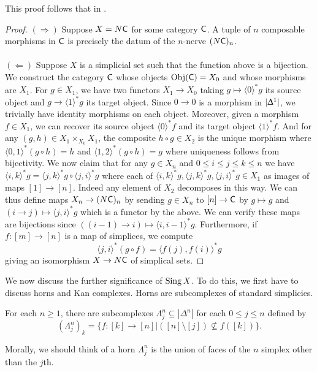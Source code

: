 This proof follows that in \cite[Proposition 1.4.8]{Rezk}.
\begin{proof}
  $(\Longrightarrow)$ Suppose $X=N\mathsf{C}$ for some category $\mathsf{C}$. A tuple of $n$ composable morphisms in $\mathsf{C}$ is precisely the datum of the $n$-nerve $(N\mathsf{C})_{n}$. 
  \\\\
  $(\Longleftarrow)$ Suppose $X$ is a simplicial set such that the function above is a bijection. We construct the category $\mathsf{C}$ whose objects $\mathrm{Obj}(\mathsf{C})=X_{0}$ and whose morphisms are $X_{1}$. For $g\in X_{1}$, we have two functors $X_{1}\to X_{0}$ taking $g\mapsto\langle0\rangle^{*}g$ its source object and $g\to\langle1\rangle^{*}g$ its target object. Since $0\to0$ is a morphism in $|\Updelta^{1}|$, we trivially have identity morphisms on each object. Moreover, given a morphism $f\in X_{1}$, we can recover its source object $\langle0\rangle^{*}f$ and its target object $\langle1\rangle^{*}f$. And for any $(g,h)\in X_{1}\times_{X_{0}}X_{1}$, the composite $h\circ g\in X_{2}$ is the unique morphism where $\langle0,1\rangle^{*}(g\circ h)=h$ and $\langle 1,2\rangle^{*}(g\circ h)=g$ where uniqueness follows from bijectivity. We now claim that for any $g\in X_{n}$ and $0\leq i\leq j\leq k\leq n$ we have $\langle i,k\rangle^{*}g=\langle j,k\rangle^{*}g\circ\langle j,i\rangle^{*}g$ where each of $\langle i,k\rangle^{*}g,\langle j,k\rangle^{*}g,\langle j,i\rangle^{*}g\in X_{1}$ as images of maps $[1]\to[n]$. Indeed any element of $X_{2}$ decomposes in this way. We can thus define maps $X_{n}\to (N\mathsf{C})_{n}$ by sending $g\in X_{n}$ to $[n]\to\mathsf{C}$ by $g\mapsto g$ and $(i\to j)\mapsto \langle j, i\rangle^{*}g$ which is a functor by the above. We can verify these maps are bijections since $((i-1)\to i)\mapsto\langle i, i-1\rangle^{*}g$. Furthermore, if $f:[m]\to [n]$ is a map of simplices, we compute
  $$\langle j,i\rangle^{*}(g\circ f) = \langle f(j), f(i)\rangle^{*}g$$
  giving an isomorphism $X\to N\mathsf{C}$ of simplical sets. 
\end{proof}
We now discuss the further significance of $\operatorname{Sing} X$. To do this, we first have to discuss horns and Kan complexes. Horns are subcomplexes of standard simplicies. 
\begin{definition}[Horn]
  For each $n\geq1$, there are subcomplexes $\Lambda_{j}^{n}\subseteq|\Delta^{n}|$ for each $0\leq j\leq n$ defined by 
  $$(\Lambda_{j}^{n})_{k}=\{f:[k]\to[n]|([n]\setminus[j])\not\subseteq f([k])\}.$$
\end{definition}
Morally, we should think of a horn $\Lambda^{n}_{j}$ is the union of faces of the $n$ simplex other than the $j$th. 
